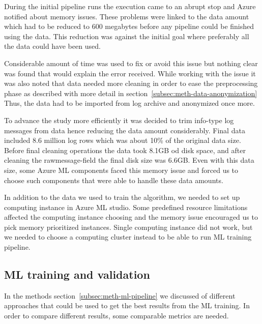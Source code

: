 During the initial pipeline runs
the execution came to an abrupt stop
and Azure notified about memory issues.
These problems were linked to the data amount
which had to be reduced to 600 megabytes
before any pipeline could be finished using the data.
This reduction was against the initial goal
where preferably all the data could have been used.

Considerable amount of time was used
to fix or avoid this issue
but nothing clear was found
that would explain the error received.
While working with the issue
it was also noted
that data needed more cleaning
in order to ease the preprocessing phase
as described with more detail in section~\ref{subsec:meth-data-anonymization}
Thus,
the data had to be imported from log archive
and anonymized once more.

To advance the study more efficiently
it was decided to trim info-type log messages from data
hence reducing the data amount considerably.
Final data included 8.6 million log rows
which was about 10\% of the original data size.
Before final cleaning operations
the data took 8.1GB od disk space,
and after cleaning the rawmessage-field
the final disk size was 6.6GB.
Even with this data size,
some Azure ML components faced this memory issue
and forced us to choose such components
that were able to handle these data amounts.


In addition to the data we used to train the algorithm,
we needed to set up computing instance
in Azure ML studio.
Some predefined resource limitations
affected the computing instance choosing
and the memory issue encouraged us
to pick memory prioritized instances.
Single computing instance did not work,
but we needed to choose a computing cluster instead
to be able to run ML training pipeline.





\subsection{ML training and validation}\label{subsec:res-ml-training-and-validation}

In the methods section~\ref{subsec:meth-ml-pipeline}
we discussed of different approaches that could be used
to get the best results from the ML training.
In order to compare different results,
some comparable metrics are needed.

